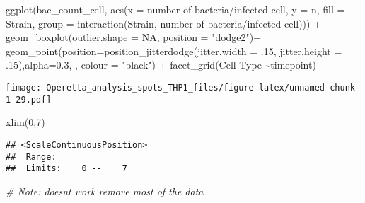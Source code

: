 \documentclass[
]{article}
\newenvironment{Shaded}{\begin{snugshade}}{\end{snugshade}}
\newcommand{\AttributeTok}[1]{\textcolor[rgb]{0.77,0.63,0.00}{#1}}
\newcommand{\CommentTok}[1]{\textcolor[rgb]{0.56,0.35,0.01}{\textit{#1}}}
\newcommand{\ConstantTok}[1]{\textcolor[rgb]{0.00,0.00,0.00}{#1}}
\newcommand{\DecValTok}[1]{\textcolor[rgb]{0.00,0.00,0.81}{#1}}
\newcommand{\FloatTok}[1]{\textcolor[rgb]{0.00,0.00,0.81}{#1}}
\newcommand{\FunctionTok}[1]{\textcolor[rgb]{0.00,0.00,0.00}{#1}}
\newcommand{\NormalTok}[1]{#1}
\newcommand{\SpecialCharTok}[1]{\textcolor[rgb]{0.00,0.00,0.00}{#1}}
\newcommand{\StringTok}[1]{\textcolor[rgb]{0.31,0.60,0.02}{#1}}
\begin{document}
\begin{Shaded}
\begin{Highlighting}[]
\FunctionTok{ggplot}\NormalTok{(bac\_count\_cell, }\FunctionTok{aes}\NormalTok{(}\AttributeTok{x =} \StringTok{\textasciigrave{}}\AttributeTok{number of bacteria/infected cell}\StringTok{\textasciigrave{}}\NormalTok{, }\AttributeTok{y =}\NormalTok{ n, }\AttributeTok{fill =} \StringTok{\textasciigrave{}}\AttributeTok{Strain}\StringTok{\textasciigrave{}}\NormalTok{,}
                           \AttributeTok{group =}  \FunctionTok{interaction}\NormalTok{(}\StringTok{\textasciigrave{}}\AttributeTok{Strain}\StringTok{\textasciigrave{}}\NormalTok{, }\StringTok{\textasciigrave{}}\AttributeTok{number of bacteria/infected cell}\StringTok{\textasciigrave{}}\NormalTok{))) }\SpecialCharTok{+}
  \FunctionTok{geom\_boxplot}\NormalTok{(}\AttributeTok{outlier.shape =} \ConstantTok{NA}\NormalTok{, }\AttributeTok{position =} \StringTok{"dodge2"}\NormalTok{)}\SpecialCharTok{+}
  \FunctionTok{geom\_point}\NormalTok{(}\AttributeTok{position=}\FunctionTok{position\_jitterdodge}\NormalTok{(}\AttributeTok{jitter.width =}\NormalTok{ .}\DecValTok{15}\NormalTok{, }\AttributeTok{jitter.height =}\NormalTok{ .}\DecValTok{15}\NormalTok{),}\AttributeTok{alpha=}\FloatTok{0.3}\NormalTok{, , }\AttributeTok{colour =} \StringTok{"black"}\NormalTok{) }\SpecialCharTok{+}
  \FunctionTok{facet\_grid}\NormalTok{(}\StringTok{\textasciigrave{}}\AttributeTok{Cell Type}\StringTok{\textasciigrave{}} \SpecialCharTok{\textasciitilde{}}\NormalTok{timepoint)}
\end{Highlighting}
\end{Shaded}

\texttt{[image: Operetta\_analysis\_spots\_THP1\_files/figure-latex/unnamed-chunk-1-29.pdf]}

\begin{Shaded}
\begin{Highlighting}[]
\FunctionTok{xlim}\NormalTok{(}\DecValTok{0}\NormalTok{,}\DecValTok{7}\NormalTok{)}
\end{Highlighting}
\end{Shaded}

\begin{verbatim}
## <ScaleContinuousPosition>
##  Range:  
##  Limits:    0 --    7
\end{verbatim}

\begin{Shaded}
\begin{Highlighting}[]
\CommentTok{\# Note: doesn\textquotesingle{}t work remove most of the data}
\end{Highlighting}
\end{Shaded}
\end{document}
